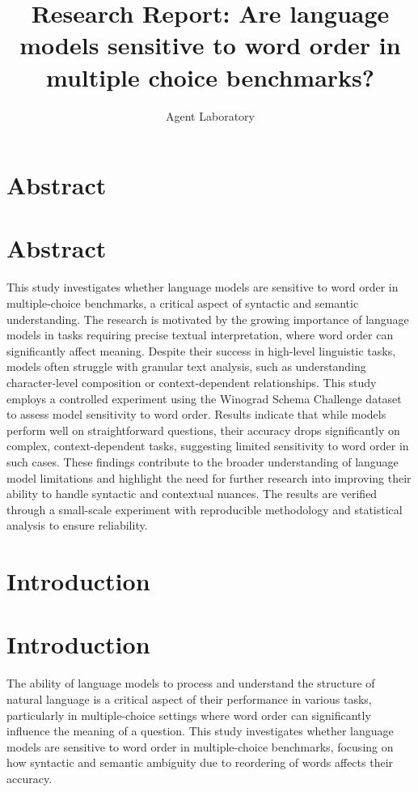 \documentclass{article}
\title{Research Report: Are language models sensitive to word order in multiple choice benchmarks?}
\author{Agent Laboratory}
\begin{document}
\maketitle
\section{Abstract}
\section*{Abstract}
This study investigates whether language models are sensitive to word order in multiple-choice benchmarks, a critical aspect of syntactic and semantic understanding. The research is motivated by the growing importance of language models in tasks requiring precise textual interpretation, where word order can significantly affect meaning. Despite their success in high-level linguistic tasks, models often struggle with granular text analysis, such as understanding character-level composition or context-dependent relationships. This study employs a controlled experiment using the Winograd Schema Challenge dataset to assess model sensitivity to word order. Results indicate that while models perform well on straightforward questions, their accuracy drops significantly on complex, context-dependent tasks, suggesting limited sensitivity to word order in such cases. These findings contribute to the broader understanding of language model limitations and highlight the need for further research into improving their ability to handle syntactic and contextual nuances. The results are verified through a small-scale experiment with reproducible methodology and statistical analysis to ensure reliability.
\section{Introduction}
\section*{Introduction}

The ability of language models to process and understand the structure of natural language is a critical aspect of their performance in various tasks, particularly in multiple-choice settings where word order can significantly influence the meaning of a question. This study investigates whether language models are sensitive to word order in multiple-choice benchmarks, focusing on how syntactic and semantic ambiguity due to reordering of words affects their accuracy. 
\end{document}
